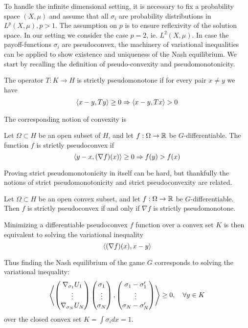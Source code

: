To handle the infinite dimensional setting, it is necessary to fix a probability space $(X,\mu)$ and assume that all $\sigma_i$ are probability distributions in $L^p(X,\mu), p>1$. The assumption on $p$ is to ensure reflexivity of the solution space. In our setting we consider the case $p=2$, ie. $L^2(X,\mu)$. In case the payoff-functions $\sigma_i$ are pseudoconvex, the machinery of variational inequalities can be applied to show existence and uniqueness of the Nash equilibrium. We start by recalling the definition of pseudo-convexity and pseudomonotonicity.
\begin{definition}
  The operator $T: K \to H$ is strictly pseudomonotone if for every pair $x\neq y$ we have
  \begin{align}
    \left \langle x-y,Ty \right \rangle \geq 0 \Rightarrow \left \langle x-y,Tx \right \rangle > 0
  \end{align}
\end{definition}
The corresponding notion of convexity is
\begin{definition}
  Let $\Omega \subset H$ be an open subset of $H$, and let $f:\Omega \to \mathbb{R}$ be $G$-differentiable. The function $f$ is strictly pseudoconvex if
  \begin{equation}
    \left \langle y-x,(\nabla f)(x) \right \rangle \geq 0 \Rightarrow f(y) > f(x)
  \end{equation}
\end{definition}
Proving strict pseudomonotonicity in itself can be hard, but thankfully the notions of strict pseudomonotonicity and strict pseudoconvexity are related.
\begin{theorem}
  Let $\Omega \subset H$ be an open convex subset, and let $f:\Omega \to \mathbb{R}$ be $G$-differentiable. Then $f$ is strictly pseudoconvex if and only if $\nabla f$ is strictly pseudomonotone.
\end{theorem}
Minimizing a differentiable pseudoconvex $f$ function over a convex set $K$ is then equivalent to solving the variational inequality
\begin{equation}
  \left \langle (\nabla f)(x),x-y \right \rangle
\end{equation}

Thus finding the Nash equilibrium of the game $G$ corresponds to solving the variational inequality:
\begin{equation}
  \left \langle 
  \begin{pmatrix}
    \nabla_{\sigma_1} U_1\\
    \vdots \\
    \nabla_{\sigma_N} U_N
\end{pmatrix} \begin{pmatrix}
    \sigma_1 \\
    \vdots \\
    \sigma_N
\end{pmatrix},\begin{pmatrix} \sigma_1 - \sigma'_1 \\ \vdots \\ \sigma_N - \sigma'_N \end{pmatrix} \right \rangle \geq 0, \quad \forall y\in K
\end{equation}
over the closed convex set $K = \int \sigma_i dx= 1$.

